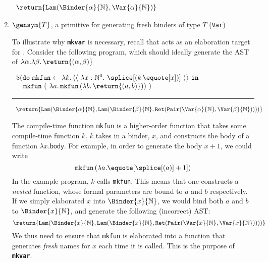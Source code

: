 \begin{enumerate}
\begin{core}
\textcolor{coreComment}{$\begin{array}{l}\return{\texttt{Lam}(\Binder{\alpha}{\mathbb{N}}, \Var{\alpha}{\mathbb{N}})}\end{array}$}
\end{core}

\item $\gensym{T}$, a primitive for generating fresh binders of type $T$ (\underline{\texttt{Var}})

To illustrate why \textbf{\texttt{mkvar}} is necessary, recall that \coreLang{} acts as an elaboration target for \sourceLang{}. Consider the following \sourceLang{} program, which should ideally generate the AST of $\lambda \alpha. \lambda \beta. \, \return{(\alpha, \beta)}$

\begin{source}
$\begin{array}{l}
\$(\textbf{\texttt{do}} \, \, \texttt{mkfun} \leftarrow {\lambda k. \, {\langle\langle\,\, \lambda x: \mathbb{N}^0. \,\, \splice[(k \, {\equote[x]})]\,\, \rangle\rangle}} \, \, \textbf{\texttt{in}} \\
\quad \texttt{mkfun} \,\, (\,\, \lambda a. \, \texttt{mkfun} \, (\lambda b. \, \return{(a, b)})) \,\, )
\end{array}$

\vspace{2mm} 
\textcolor{sourceComment}{\hrule height 0.2mm \relax}
\vspace{2mm} 

\textcolor{sourceComment}{$\begin{array}{l}\return{\texttt{Lam}(\Binder{\alpha}{\mathbb{N}}, \texttt{Lam}(\Binder{\beta}{\mathbb{N}}, \texttt{Ret}(\texttt{Pair}(\Var{\alpha}{\mathbb{N}}, \Var{\beta}{\mathbb{N}}))))}\end{array}$}
\end{source}

The compile-time function \texttt{mkfun} is a higher-order function that takes some compile-time function $k$. $k$ takes in a binder, $x$, and constructs the \textsf{body} of a function $\lambda x. \textsf{body}$. For example, in order to generate the body $x + 1$, we could write 
\[\texttt{mkfun} \,  (\lambda a. \equote[{\splice[(a)]} + 1]) \]
In the example \sourceLang{} program, $k$ calls \texttt{mkfun}. This means that one constructs a \textit{nested} function, whose formal parameters are bound to $a$ and $b$ respectively. If we simply elaborated $x$ into $\Binder{x}{\mathbb{N}}$, we would bind both $a$ and $b$ to $\Binder{x}{\mathbb{N}}$, and generate the following (incorrect) AST: 
 \[\return{\texttt{Lam}(\Binder{x}{\mathbb{N}}, \texttt{Lam}(\Binder{x}{\mathbb{N}}, \texttt{Ret}(\texttt{Pair}(\Var{x}{\mathbb{N}}, \Var{x}{\mathbb{N}}))))}\]
 We thus need to ensure that \texttt{mkfun} is elaborated into a function that generates \textit{fresh} names for $x$ each time it is called. This is the purpose of \textbf{\texttt{mkvar}}. 
\end{enumerate}

